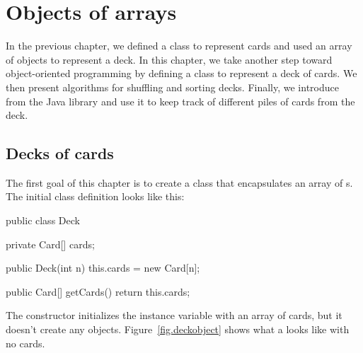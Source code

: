 \chapter{Objects of arrays}


In the previous chapter, we defined a class to represent cards and used an array of  objects to represent a deck.
In this chapter, we take another step toward object-oriented programming by defining a class to represent a deck of cards.
We then present algorithms for shuffling and sorting decks.
Finally, we introduce  from the Java library and use it to keep track of different piles of cards from the deck.





\section{Decks of cards}
\label{deck}


The first goal of this chapter is to create a  class that encapsulates an array of s.
The initial class definition looks like this:

\begin{code}
public class Deck {
    private Card[] cards;

    public Deck(int n) {
        this.cards = new Card[n];
    }

    public Card[] getCards() {
        return this.cards;
    }
}
\end{code}


The constructor initializes the instance variable with an array of  cards, but it doesn't create any  objects.
Figure~\ref{fig.deckobject} shows what a  looks like with no cards.

